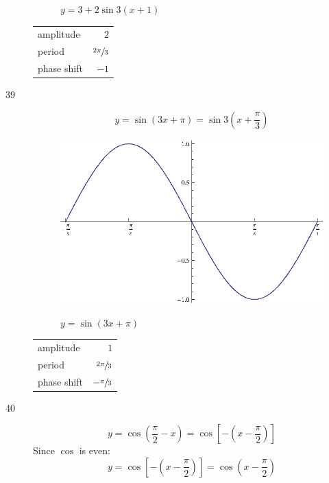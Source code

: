 \documentclass{exam}
\begin{document}
\begin{description}
\begin{figure}[H]
          $y = 3 + 2 \sin 3 \left( x + 1 \right)$
        \end{figure}

        \begin{tabular}[H]{lr}
          \toprule
          amplitude   & $2$ \\
          period      & $\sfrac{2 \pi}{3}$ \\
          phase shift & $-1$ \\
          \bottomrule
        \end{tabular}

      \pagebreak

      \item[39]
        \[
          y = \sin \left( 3x + \pi \right) = \sin 3 \left( x + \frac{\pi}{3} \right) 
        \]

        \begin{figure}[H]
          \centering
          \includegraphics[scale=1.0]{exercise39.eps}

          $y = \sin \left( 3x + \pi \right)$
        \end{figure}

        \begin{tabular}[H]{lr}
          \toprule
          amplitude   & $1$ \\
          period      & $\sfrac{2 \pi}{3}$ \\
          phase shift & $- \sfrac{\pi}{3}$ \\
          \bottomrule
        \end{tabular}

      \pagebreak

      \item[40]
        \[
          y = \cos \left( \frac{\pi}{2} - x \right) = \cos \left[ - \left( x - \frac{\pi}{2} \right) \right]
        \]
        Since $\cos$ is even:
        \[
          y = \cos \left[ - \left( x - \frac{\pi}{2} \right) \right] = \cos \left( x - \frac{\pi}{2} \right)
        \]



\end{description}
\end{document}
